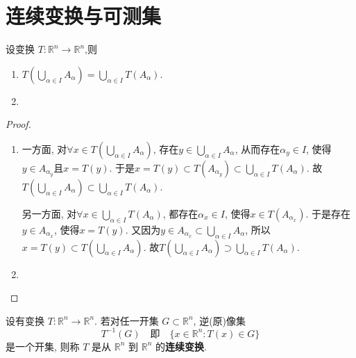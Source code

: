 \documentclass[../../main.tex]{subfiles}%
\begin{document}
\section{连续变换与可测集}

\begin{theorem}[变换的基本性质]\label{theorem:变换的基本性质}
设变换 $T:\mathbb{R}^n\to\mathbb{R}^n$,则
\begin{enumerate}
\item $T\left( \bigcup_{\alpha \in I}{A_{\alpha}} \right) =\bigcup_{\alpha \in I}{T\left( A_{\alpha} \right)}$.

\item 
\end{enumerate}
\end{theorem}
\begin{proof}
\begin{enumerate}
\item 一方面, 对$\forall x\in T\left( \bigcup_{\alpha \in I}{A_{\alpha}} \right)$, 存在$y\in \bigcup_{\alpha \in I}{A_{\alpha}}$, 从而存在$\alpha _y\in I$, 使得$y\in A_{\alpha _y}$且$x=T\left( y \right)$. 于是$x=T\left( y \right) \subset T\left( A_{\alpha _y} \right) \subset \bigcup_{\alpha \in I}{T\left( A_{\alpha} \right)}$. 故$T\left( \bigcup_{\alpha \in I}{A_{\alpha}} \right) \subset \bigcup_{\alpha \in I}{T\left( A_{\alpha} \right)}$.

另一方面, 对$\forall x\in \bigcup_{\alpha \in I}{T\left( A_{\alpha} \right)}$, 都存在$\alpha _x\in I$, 使得$x\in T\left( A_{\alpha _x} \right)$. 于是存在$y\in A_{\alpha _x}$, 使得$x=T\left( y \right)$. 又因为$y\in A_{\alpha _x}\subset \bigcup_{\alpha \in I}{A_{\alpha}}$, 所以$x=T\left( y \right) \subset T\left( \bigcup_{\alpha \in I}{A_{\alpha}} \right)$. 故$T\left( \bigcup_{\alpha \in I}{A_{\alpha}} \right) \supset \bigcup_{\alpha \in I}{T\left( A_{\alpha} \right)}$.

\item 
\end{enumerate}
\end{proof}

\begin{definition}[连续变换]
设有变换 $T:\mathbb{R}^n\to\mathbb{R}^n$. 若对任一开集 $G\subset\mathbb{R}^n$, 逆(原)像集
\[
T^{-1}(G)\quad \text{即}\quad \{x\in\mathbb{R}^n:T(x)\in G\}
\]
是一个开集, 则称 $T$ 是从 $\mathbb{R}^n$ 到 $\mathbb{R}^n$ 的\textbf{连续变换}.
\end{definition}
\end{document}
